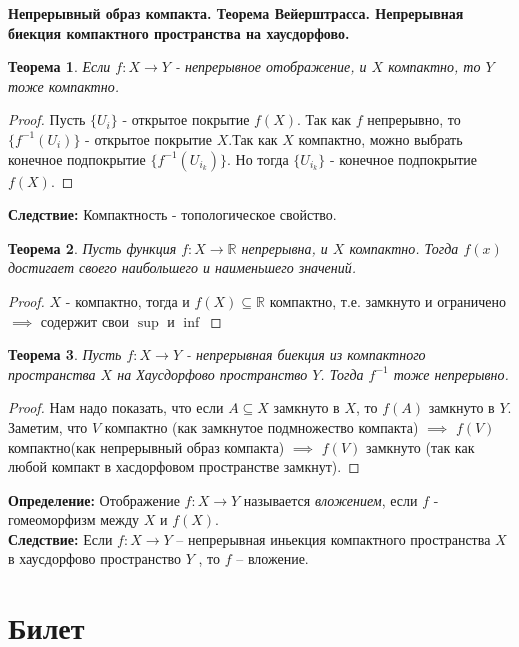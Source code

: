 \documentclass[a4paper,100pt]{article}
\theoremstyle{indented}
\newtheorem{theorem}{Теорема}
\begin{document}
\medskip

\textbf{Непрерывный образ компакта. Теорема Вейерштрасса. Непрерывная биекция компактного пространства на хаусдорфово.}\\

\begin{theorem}
    Если $f: X \rightarrow Y$ - непрерывное отображение, и $X$ компактно, то $Y$ тоже компактно.
    \end{theorem}
    \begin{proof}
    Пусть $\{U_i\}$ - открытое покрытие $f(X)$. Так как $f$ непрерывно, то $\{f^{-1}(U_i)\}$ - открытое покрытие $X$.Так как $X$ компактно, можно выбрать конечное подпокрытие $\{f^{-1}(U_{i_k})\}$. Но тогда $\{U_{i_k}\}$ - конечное подпокрытие $f(X)$.
    \end{proof}
    \textbf{Следствие:} Компактность - топологическое свойство.\\

    \begin{theorem}
    Пусть функция $f: X \rightarrow \mathbb{R}$ непрерывна, и $X$ компактно. Тогда $f(x)$ достигает своего наибольшего и наименьшего значений.
    \end{theorem}
    \begin{proof}
    $X$ - компактно, тогда и $f(X) \subseteq \mathbb{R}$ компактно, т.е. замкнуто и ограничено $\implies$ содержит свои $\sup$ и $\inf$
    \end{proof}
    \begin{theorem}
    Пусть $f: X \rightarrow Y$ - непрерывная биекция из компактного пространства $X$ на Хаусдорфово пространство $Y$. Тогда $f^{-1}$ тоже непрерывно.
    \end{theorem}
    \begin{proof}
    Нам надо показать, что если $A \subseteq X$ замкнуто в $X$, то $f(A)$ замкнуто в $Y$. Заметим, что $V$ компактно (как замкнутое подмножество компакта) $\implies$ $f(V)$ компактно(как непрерывный образ компакта) $\implies$ $f(V)$ замкнуто (так как любой компакт в хасдорфовом пространстве замкнут).
    \end{proof}
    \textbf{Определение:} Отображение $f: X \rightarrow Y$ называется \textit{вложением}, если $f$ - гомеоморфизм между $X$ и $f(X)$.
    \\
    \textbf{Следствие: }Если $f : X \rightarrow Y$ – непрерывная иньекция компактного пространства $X$ в хаусдорфово пространство $Y$ , то $f$ – вложение.

\section{Билет} \
\end{document}
